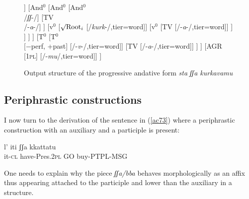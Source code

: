 \documentclass[output=paper]{langscibook}
\begin{document}
\begin{figure}
  \caption{\label{ac72}Output structure of the progressive andative form \textit{sta ʃʃa kurkavamu}}
  \resizebox{\textwidth}{!}
  {\begin{forest}
  	[T$^0$
  		[T$^0$
	  		[$\surd{} + \text{prog}$
	  			[$\surd{} + \text{prog}$
	  				[$\surd{} + \text{prog}$\\/\textit{st}-/]
	  				[TV\\/-\textit{a}-/]
	  			]
	  			[And$^0$
	  				[And$^0$
	  					[And$^0$\\/\textit{ʃʃ}-/]
	  					[TV\\/-\textit{a}-/]
	  				]
	  				[v$^0$
	  					[$\surd\text{Root}_i$ [/\textit{kurk}-/,tier=word]]
	  					[v$^0$
	  						[TV [/-\textit{a}-/,tier=word]]
	  					]
	  				]
	  			]
	  		]
	  		[T$^0$
	  			[T$^0$\\{[−perf, +past]} [/-\textit{v}-/,tier=word]]
	  			[TV [/-\textit{a}-/,tier=word]]
	  		]
  		]
  		[AGR\\\textsc{[1pl]} [/-\textit{mu}/,tier=word]]
  	]
  \end{forest}}
\end{figure}

\subsection{Periphrastic constructions}\label{sec:calabrese:3.4}

I now turn to the derivation of the sentence in (\ref{ac73}) where a periphrastic construction with an auxiliary and a participle is present:

\ea\label{ac73}
\gll l’    iti         ʃʃa   kkattatu\\
   it-\textsc{cl}  have-Pres.\textsc{2pl}    GO  buy-PTPL-MSG\\
\z

One needs to explain why the piece \textit{ʃʃa/bba} behaves morphologically as an affix thus appearing attached  to the participle and lower than the auxiliary in a structure.
\end{document}
